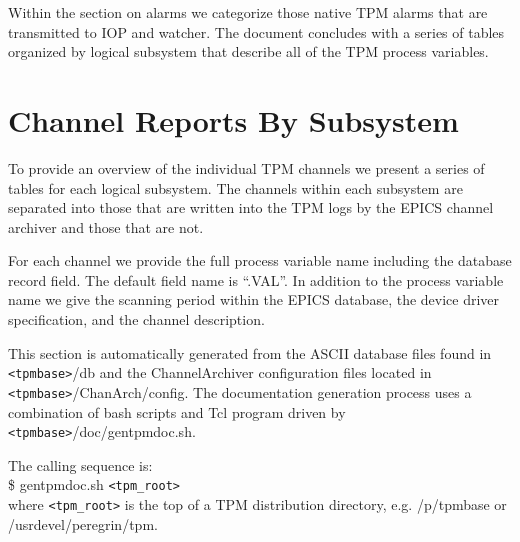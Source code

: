 \documentclass[preprint]{aastex}
\begin{document}
Within the section on alarms we categorize those native TPM alarms
that are transmitted to IOP and watcher. The document concludes
with a series of tables organized by logical subsystem that
describe all of the TPM process variables.











\section{Channel Reports By Subsystem}

To provide an overview of the individual TPM channels we present
a series of tables for each logical subsystem. The channels within
each subsystem are separated into those that are written into the
TPM logs by the EPICS channel archiver and those that are not.

For each channel we provide the full process variable name 
including the database record field. The default field name
is ``.VAL''. In addition to the process variable name we
give the scanning period within the EPICS database, the device
driver specification, and the channel description.

This section is automatically generated from the ASCII database
files found in {\tt<tpmbase>}/db and the ChannelArchiver
configuration files located in {\tt<tpmbase>}/ChanArch/config. The
documentation generation process uses a combination of bash scripts
and Tcl program driven by {\tt<tpmbase>}/doc/gentpmdoc.sh.

The calling sequence is:\\
\$ gentpmdoc.sh {\tt<tpm\_root>} \\
where {\tt<tpm\_root>} is the top of a TPM distribution directory, e.g.
/p/tpmbase or /usrdevel/peregrin/tpm.


\end{document}
